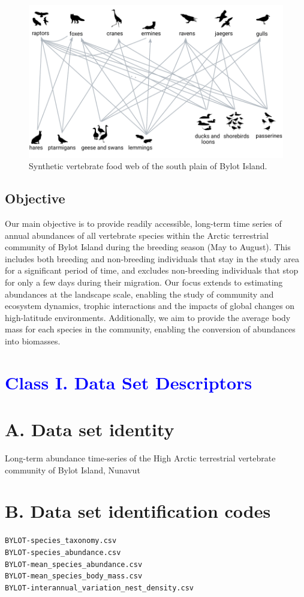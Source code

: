\documentclass[a4paper,twoside,12pt]{article}
\begin{document}
\begin{figure}[H]
\centering
\includegraphics[width=0.75\linewidth]{figures/food_web.pdf} 
\caption{Synthetic vertebrate food web of the south plain of Bylot Island.}
\label{figure:food_web}
\end{figure}
\subsection*{Objective}
Our main objective is to provide readily accessible, long-term time series of annual abundances of all vertebrate species within the Arctic terrestrial community of Bylot Island during the breeding season (May to August). This includes both breeding and non-breeding individuals that stay in the study area for a significant period of time, and excludes non-breeding individuals that stop for only a few days during their migration. Our focus extends to estimating abundances at the landscape scale, enabling the study of community and ecosystem dynamics, trophic interactions and the impacts of global changes on high-latitude environments. Additionally, we aim to provide the average body mass for each species in the community, enabling the conversion of abundances into biomasses.
\newpage
\section*{\textcolor{Blue}{Class I. Data Set Descriptors}}
    \section*{A. Data set identity} Long-term abundance time-series of the High Arctic terrestrial vertebrate community of Bylot Island, Nunavut
    \section*{B. Data set identification codes}
     \texttt{BYLOT-species\_taxonomy.csv}\\
     \texttt{BYLOT-species\_abundance.csv}\\
     \texttt{BYLOT-mean\_species\_abundance.csv}\\
     \texttt{BYLOT-mean\_species\_body\_mass.csv}\\
     \texttt{BYLOT-interannual\_variation\_nest\_density.csv}\\
     
\end{document}
